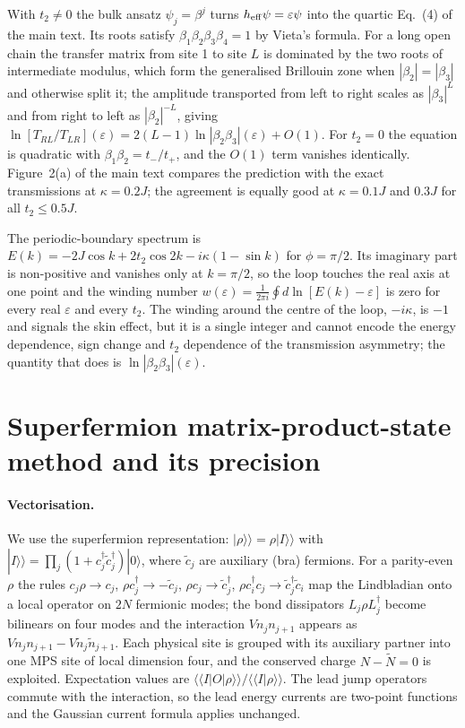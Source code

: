 \documentclass[reprint,aps,prl,superscriptaddress,nofootinbib,floatfix]{revtex4-2}
\newcommand{\heff}{h_{\rm eff}}
\begin{document}
With $t_2\neq0$ the bulk ansatz $\psi_j=\beta^j$ turns $\heff\psi=\varepsilon\psi$ into the quartic Eq.~(4) of the main text. Its roots satisfy $\beta_1\beta_2\beta_3\beta_4=1$ by Vieta's formula. For a long open chain the transfer matrix from site 1 to site $L$ is dominated by the two roots of intermediate modulus, which form the generalised Brillouin zone when $|\beta_2|=|\beta_3|$ and otherwise split it; the amplitude transported from left to right scales as $|\beta_3|^{L}$ and from right to left as $|\beta_2|^{-L}$, giving $\ln[T_{RL}/T_{LR}](\varepsilon)=2(L-1)\ln|\beta_2\beta_3|(\varepsilon)+O(1)$. For $t_2=0$ the equation is quadratic with $\beta_1\beta_2=t_-/t_+$, and the $O(1)$ term vanishes identically. Figure~2(a) of the main text compares the prediction with the exact transmissions at $\kappa=0.2J$; the agreement is equally good at $\kappa=0.1J$ and $0.3J$ for all $t_2\le0.5J$.

The periodic-boundary spectrum is $E(k)=-2J\cos k+2t_2\cos2k-i\kappa(1-\sin k)$ for $\phi=\pi/2$. Its imaginary part is non-positive and vanishes only at $k=\pi/2$, so the loop touches the real axis at one point and the winding number $w(\varepsilon)=\frac{1}{2\pi i}\oint d\ln[E(k)-\varepsilon]$ is zero for every real $\varepsilon$ and every $t_2$. The winding around the centre of the loop, $-i\kappa$, is $-1$ and signals the skin effect, but it is a single integer and cannot encode the energy dependence, sign change and $t_2$ dependence of the transmission asymmetry; the quantity that does is $\ln|\beta_2\beta_3|(\varepsilon)$.

\section{Superfermion matrix-product-state method and its precision}
\label{sec:mps}

\paragraph{Vectorisation.}
We use the superfermion representation: $|\rho\rangle\!\rangle=\rho|I\rangle\!\rangle$ with $|I\rangle\!\rangle=\prod_j(1+c_j^\dagger\tilde c_j^\dagger)|0\rangle$, where $\tilde c_j$ are auxiliary (bra) fermions. For a parity-even $\rho$ the rules $c_j\rho\to c_j$, $\rho c_j^\dagger\to-\tilde c_j$, $\rho c_j\to\tilde c_j^\dagger$, $\rho c_i^\dagger c_j\to\tilde c_j^\dagger\tilde c_i$ map the Lindbladian onto a local operator on $2N$ fermionic modes; the bond dissipators $L_j\rho L_j^\dagger$ become bilinears on four modes and the interaction $Vn_jn_{j+1}$ appears as $V n_jn_{j+1}-V\tilde n_j\tilde n_{j+1}$. Each physical site is grouped with its auxiliary partner into one MPS site of local dimension four, and the conserved charge $N-\tilde N=0$ is exploited. Expectation values are $\langle\!\langle I|O|\rho\rangle\!\rangle/\langle\!\langle I|\rho\rangle\!\rangle$. The lead jump operators commute with the interaction, so the lead energy currents are two-point functions and the Gaussian current formula applies unchanged.
\end{document}
